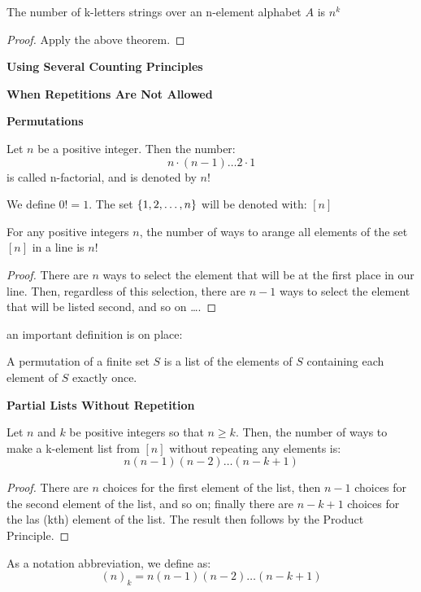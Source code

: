 \begin{cor}
	The number of k-letters strings over an n-element alphabet $A$ is $n^k$
\end{cor}
\begin{proof}
	Apply the above theorem.
\end{proof}

\textbf{Using Several Counting Principles}

\textbf{When Repetitions Are Not Allowed}

\textbf{Permutations}

\begin{define}
	Let $n$ be a positive integer. Then the number:
	\[ n \cdot (n-1) \ldots 2 \cdot 1 \]
	is called n-factorial, and is denoted by $n!$
\end{define}
We define $0! = 1$.
The set $ \left\lbrace 1,2, \ldots, n \right\rbrace $ will be denoted with: $ [n] $ 
\begin{thm}
	For any positive integers $n$, the number of ways to arange all elements of the set $ [n] $ in a line is $n!$
\end{thm}
\begin{proof}
	There are $n$ ways to select the element that will be at the first place in our line. Then, regardless of this selection, there are $n-1$ ways to select the element that will be listed second, and so on \ldots.
\end{proof}
an important definition is on place:

\begin{define}
	A permutation of a finite set $S$ is a list of the elements of $S$ containing each element of $S$ exactly once.
\end{define}

\textbf{Partial Lists Without Repetition}

\begin{thm}
	Let $n$ and $k$ be positive integers so that $ n \geq k$. Then, the number of ways to make a k-element list from $[n]$ without repeating any elements is:
	\[ n(n-1)(n-2) \ldots (n-k+1) \]
\end{thm}
\begin{proof}
	There are $n$ choices for the first element of the list, then $n-1$ choices for the second element of the list, and so on; finally there are $n-k+1$ choices for the las (kth) element of the list. The result then follows by the Product Principle.
\end{proof}
As a notation abbreviation, we define as:
\[ (n)_k = n(n-1)(n-2)\ldots(n-k+1) \]
 
